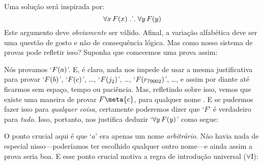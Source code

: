Uma solução será inspirada por:
$$\forall x\,\mathord{F}(x) \mathrel{\ldotp\dot{}\,\ldotp} \forall y\,\mathord{F}(y)$$
Este argumento deve \emph{obviamente} ser válido. Afinal, a variação alfabética deve ser uma questão de gosto e  não de consequência lógica. Mas como nosso sistema de provas  pode refletir isso? Suponha que comecemos uma prova assim:
\begin{fitchproof}
	 
\end{fitchproof}
  Nós provamos `$\mathord{F}(a)$'. E, é claro, nada nos impede de usar a mesma justificativa para provar `$\mathord{F}(b)$', `$\mathord{F}(c)$', \ldots, `$\mathord{F}(j_2)$', \ldots, `$\mathord{F}(r_{79002})$', \dots, e assim por diante até ficarmos sem espaço, tempo ou paciência. Mas, refletindo sobre isso, vemos que existe uma maneira de provar $F\meta{c}$, para qualquer nome . E se pudermos fazer isso para   \emph{qualquer coisa}, certamente poderemos dizer que  `$F$' é verdadeiro para \emph{tudo}. Isso, portanto, nos justifica deduzir `$\forall y\,\mathord{F}(y)$' como segue:
\begin{fitchproof}
	 
	 
\end{fitchproof}
O ponto crucial aqui é que `$a$' era apenas um nome \emph{arbitrário}. Não havia nada de especial nisso---poderíamos ter escolhido qualquer outro nome---e ainda assim a prova seria boa. E esse ponto crucial motiva a regra de introdução  universal ($\forall$I):

